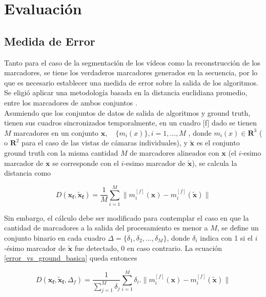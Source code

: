 \chapter{Evaluación}
\label{evaluacion}
\section{Medida de Error}
\label{subsec:medida_error}

Tanto para el caso de la segmentación de los vídeos como la reconstrucción de los marcadores, se tiene los verdaderos marcadores generados en la secuencia, por lo que es necesario establecer una medida de error sobre la salida de los algoritmos. Se eligió aplicar una metodología basada en la distancia euclidiana promedio, entre los marcadores de ambos conjuntos \cite{humaneva} . 
\\ 

Asumiendo que los conjuntos de datos de salida de algoritmos y ground truth, tienen sus cuadros sincronizados temporalmente, en un cuadro [f] dado se tienen $M$ marcadores en un conjunto $ \boldsymbol{x},\quad\{m_{i}(x)\},i=1,\ldots,M $ , donde $ m_{i}(x)\in{\mathbf{R}^{3}} $ ( o $ \mathbf{R}^{2} $ para el caso de las vistas de cámaras individuales), y $ \boldsymbol{\tilde{x}} $ es el conjunto ground truth con la misma cantidad $M$ de marcadores alineados con $\boldsymbol{x}$ (el $i$-esimo marcador de $\boldsymbol{x}$ se corresponde con el  $i$-esimo marcador de $\boldsymbol{\tilde{x}}$), se calcula la distancia como

\begin{equation} \label{error_vs_ground_basica}
D(\boldsymbol{x_{f}},\boldsymbol{\tilde{x}_{f}})=\frac{1}{M}\sum_{i=1}^{M} \|m_{i}^{[f]}(\boldsymbol{x})-m_{i}^{[f]}(\boldsymbol{\tilde{x}})\|
\end{equation}

Sin embargo, el cálculo debe ser modificado para contemplar el caso en que la cantidad de marcadores a la salida del procesamiento es menor a $M$, se define un conjunto binario en cada cuadro $\Delta=\{\delta_1,\delta_2,\ldots,\delta_M\}$, donde $\delta_i$ indica con 1 si el $i$-ésimo marcador de $\boldsymbol{\tilde{x}}$ fue detectado, $0$ en caso contrario. La ecuación \eqref{error_vs_ground_basica} queda entonces

\begin{equation}\label{error_vs_ground_deteccion}
D(\boldsymbol{x_{f}},\boldsymbol{\tilde{x}_{f}},\Delta_{f})=\frac{1}{\sum_{j=1}^{M} \delta_j} \sum_{i=1}^{M} \delta_i.\|m_{i}^{[f]}(\boldsymbol{x})-m_{i}^{[f]}(\boldsymbol{\tilde{x}})\|
\end{equation}

